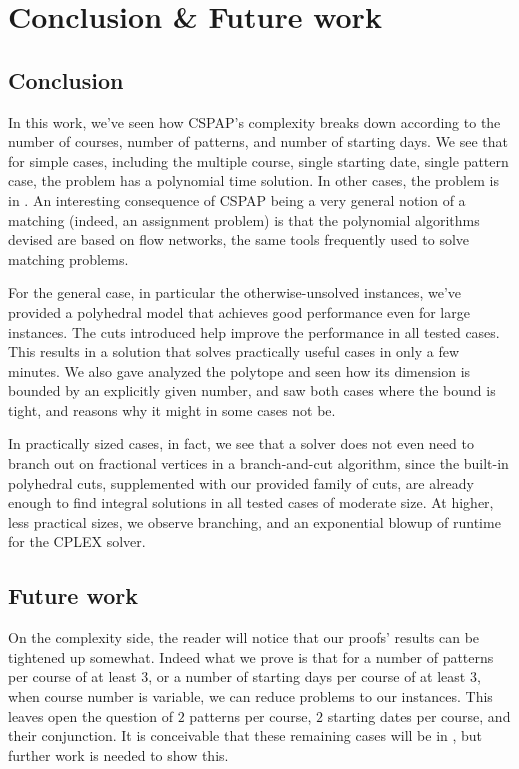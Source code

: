 \chapter{Conclusion \& Future work}

\section{Conclusion}

In this work, we've seen how CSPAP's complexity breaks down according to the number of courses, number of patterns, and number of starting days. We see that for simple cases, including the multiple course, single starting date, single pattern case, the problem has a polynomial time solution. In other cases, the problem is in \npc. An interesting consequence of CSPAP being a very general notion of a matching (indeed, an assignment problem) is that the polynomial algorithms devised are based on flow networks, the same tools frequently used to solve matching problems.

For the general case, in particular the otherwise-unsolved \npc instances, we've provided a polyhedral model that achieves good performance even for large instances. The cuts introduced help improve the performance in all tested cases. This results in a solution that solves practically useful cases in only a few minutes. We also gave analyzed the polytope and seen how its dimension is bounded by an explicitly given number, and saw both cases where the bound is tight, and reasons why it might in some cases not be.

In practically sized cases, in fact, we see that a solver does not even need to branch out on fractional vertices in a branch-and-cut algorithm, since the built-in polyhedral cuts, supplemented with our provided family of cuts, are already enough to find integral solutions in all tested cases of moderate size. At higher, less practical sizes, we observe branching, and an exponential blowup of runtime for the CPLEX solver.

\section{Future work}

On the complexity side, the reader will notice that our proofs' results can be tightened up somewhat. Indeed what we prove is that for a number of patterns per course of at least $3$, or a number of starting days per course of at least $3$, when course number is variable, we can reduce \npc problems to our instances. This leaves open the question of $2$ patterns per course, $2$ starting dates per course, and their conjunction. It is conceivable that these remaining cases will be in \p, but further work is needed to show this.

